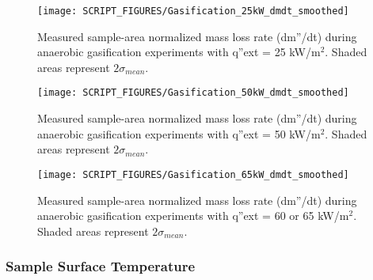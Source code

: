 \documentclass{book}
\begin{document}
\begin{figure}
  \centering
  \texttt{[image: SCRIPT\_FIGURES/Gasification\_25kW\_dmdt\_smoothed]}
  \caption{Measured sample-area normalized mass loss rate (dm”/dt) during anaerobic gasification experiments with q”ext = 25 kW/m$^2$. Shaded areas represent $2\sigma_{mean}$.}
  \label{Fig:Gasification_25kW_dmdt}
\end{figure}

\begin{figure}
  \centering
  \texttt{[image: SCRIPT\_FIGURES/Gasification\_50kW\_dmdt\_smoothed]}
  \caption{Measured sample-area normalized mass loss rate (dm”/dt) during anaerobic gasification experiments with q”ext = 50 kW/m$^2$. Shaded areas represent $2\sigma_{mean}$.}
  \label{Fig:Gasification_50kW_dmdt}
\end{figure}

\begin{figure}
  \centering
  \texttt{[image: SCRIPT\_FIGURES/Gasification\_65kW\_dmdt\_smoothed]}
  \caption{Measured sample-area normalized mass loss rate (dm”/dt) during anaerobic gasification experiments with q”ext = 60 or 65 kW/m$^2$. Shaded areas represent $2\sigma_{mean}$.}
  \label{Fig:Gasification_65kW_dmdt}
\end{figure}


\subsubsection{Sample Surface Temperature}
\end{document}
